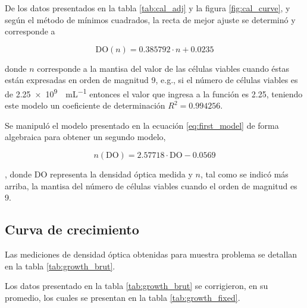 De los datos presentados en la tabla \ref{tab:cal_adj} y la figura \ref{fig:cal_curve}, y según el método de mínimos cuadrados, la recta de mejor ajuste se determinó y corresponde a 

\begin{equation}
  \text{DO}(n)=0.385792\cdot n + 0.0235
  \label{eq:first_model}
\end{equation}

donde $n$ corresponde a la mantisa del valor de las células viables cuando éstas están expresadas en orden de magnitud 9, e.g., si el número de células viables es de \SI{2.25e9}{\ufc\per\mL} entonces el valor que ingresa a la función es 2.25, teniendo este modelo un coeficiente de determinación $R^2=0.994256$.

Se manipuló el modelo presentado en la ecuación \eqref{eq:first_model} de forma algebraica para obtener un segundo modelo, 

\begin{equation}
  n(\text{DO}) = 2.57718\cdot \text{DO}-0.0569
  \label{eq:actual_model}
\end{equation}

, donde $\text{DO}$ representa la densidad óptica medida y $n$, tal como se indicó más arriba, la mantisa del número de células viables cuando el orden de magnitud es 9.

\subsection{Curva de crecimiento}

Las mediciones de densidad óptica obtenidas para muestra problema se detallan en la tabla \ref{tab:growth_brut}. 

Los datos presentado en la tabla \ref{tab:growth_brut} se corrigieron, en su promedio, los cuales se presentan en la tabla \ref{tab:growth_fixed}.

